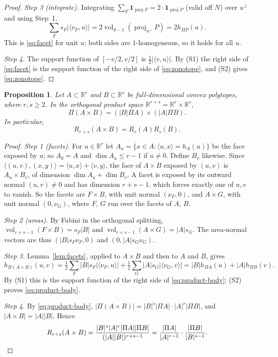 \documentclass[11pt]{article}
\newtheorem{proposition}[theorem]{Proposition}
\newcommand{\R}{\mathbb R}
\DeclareMathOperator{\vol}{vol}
\DeclareMathOperator{\proj}{proj}
\begin{document}
\begin{proof}
\emph{Step 3 (integrate).} Integrating \(\sum_F\mathbf 1_{\proj F}=2\cdot\mathbf 1_{\proj P}\) (valid off \(N\)) over \(u^\perp\) and using Step~1,
\[
 \sum_Fs_F|\langle\nu_F,u\rangle|=2\vol_{d-1}(\proj_{u^\perp}P)=2h_{\Pi P}(u).
\]
This is \eqref{eq:facet} for unit \(u\); both sides are \(1\)-homogeneous, so it holds for all \(u\).

\emph{Step 4.} The support function of \([-v/2,v/2]\) is \(\tfrac12|\langle v,u\rangle|\). By (S1) the right side of \eqref{eq:facet} is the support function of the right side of \eqref{eq:zonotope}, and (S2) gives \eqref{eq:zonotope}.
\end{proof}

\begin{proposition}\label{prop:product}
Let \(A\subset\R^r\) and \(B\subset\R^s\) be full-dimensional convex polytopes, where \(r,s\ge2\). In the orthogonal product space \(\R^{r+s}=\R^r\times\R^s\),
\begin{equation}\label{eq:product-body}
 \Pi(A\times B)=(|B|\Pi A)\times(|A|\Pi B).
\end{equation}
In particular,
\begin{equation}\label{eq:multiplicative}
 R_{r+s}(A\times B)=R_r(A)R_s(B).
\end{equation}
\end{proposition}

\begin{proof}
\emph{Step 1 (facets).} For \(u\in\R^r\) let \(A_u=\{x\in A:\langle u,x\rangle=h_A(u)\}\) be the face exposed by \(u\); so \(A_0=A\) and \(\dim A_u\le r-1\) if \(u\ne0\). Define \(B_v\) likewise. Since \(\langle(u,v),(x,y)\rangle=\langle u,x\rangle+\langle v,y\rangle\), the face of \(A\times B\) exposed by \((u,v)\) is \(A_u\times B_v\), of dimension \(\dim A_u+\dim B_v\). A facet is exposed by its outward normal \((u,v)\ne0\) and has dimension \(r+s-1\), which forces exactly one of \(u,v\) to vanish. So the facets are \(F\times B\), with unit normal \((\nu_F,0)\), and \(A\times G\), with unit normal \((0,\nu_G)\), where \(F\), \(G\) run over the facets of \(A\), \(B\).

\emph{Step 2 (areas).} By Fubini in the orthogonal splitting, \(\vol_{r+s-1}(F\times B)=s_F|B|\) and \(\vol_{r+s-1}(A\times G)=|A|s_G\). The area-normal vectors are thus \((|B|s_F\nu_F,0)\) and \((0,|A|s_G\nu_G)\).

\emph{Step 3.} Lemma~\ref{lem:facets}, applied to \(A\times B\) and then to \(A\) and \(B\), gives
\[
 h_{\Pi(A\times B)}(u,v)
 =\tfrac12\sum_F|B|s_F|\langle\nu_F,u\rangle|+\tfrac12\sum_G|A|s_G|\langle\nu_G,v\rangle|
 =|B|h_{\Pi A}(u)+|A|h_{\Pi B}(v).
\]
By (S1) this is the support function of the right side of \eqref{eq:product-body}; (S2) proves \eqref{eq:product-body}.

\emph{Step 4.} By \eqref{eq:product-body}, \(|\Pi(A\times B)|=|B|^s|\Pi A|\cdot|A|^r|\Pi B|\), and \(|A\times B|=|A||B|\). Hence
\[
 R_{r+s}(A\times B)
 =\frac{|B|^s|A|^r|\Pi A||\Pi B|}{(|A||B|)^{r+s-1}}
 =\frac{|\Pi A|}{|A|^{r-1}}\cdot\frac{|\Pi B|}{|B|^{s-1}}.\qedhere
\]
\end{proof}
\end{document}
